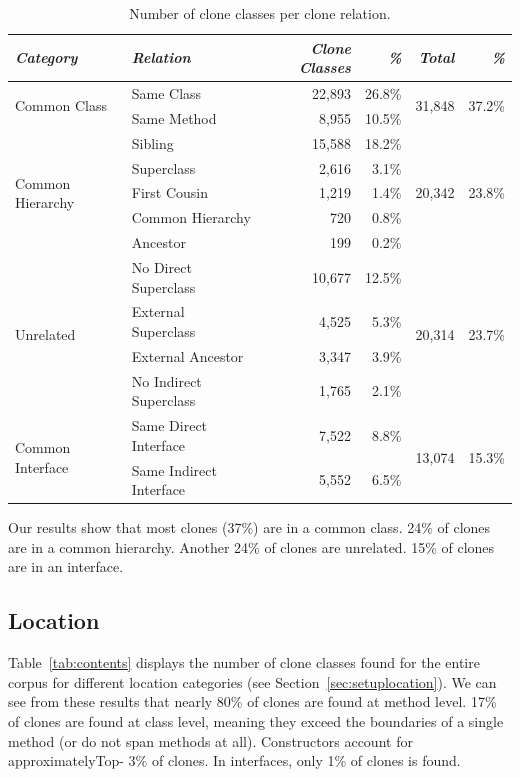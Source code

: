\documentclass[runningheads]{llncs}
\begin{document}
\begin{table}[H]
\centering
\begin{tabular}{@{}llrrrr@{}}
\toprule
\textit{\textbf{Category}} & \textit{\textbf{Relation}} & \textit{\textbf{Clone Classes}} & \textit{\textbf{\%}} & \textit{\textbf{Total}} & \textit{\textbf{\%}} \\ \midrule
\multirow{2}{*}{Common Class} & Same Class & 22,893 & 26.8\% & \multirow{2}{*}{31,848} & \multirow{2}{*}{37.2\%} \\ \cmidrule(lr){2-4}
 & Same Method & 8,955 & 10.5\% & & \\ \midrule
\multirow{5}{*}{Common Hierarchy} & Sibling & 15,588 & 18.2\% & \multirow{5}{*}{20,342}& \multirow{5}{*}{23.8\%} \\ \cmidrule(lr){2-4}
 & Superclass & 2,616 & 3.1\% & & \\ \cmidrule(lr){2-4}
 & First Cousin & 1,219 & 1.4\% & & \\ \cmidrule(lr){2-4}
 & Common Hierarchy & 720 & 0.8\% & & \\ \cmidrule(lr){2-4}
 & Ancestor & 199 & 0.2\% & & \\ \midrule
\multirow{4}{*}{Unrelated} & No Direct Superclass & 10,677 & 12.5\% & \multirow{4}{*}{20,314}& \multirow{4}{*}{23.7\%} \\ \cmidrule(lr){2-4}
 & External Superclass & 4,525 & 5.3\% & & \\ \cmidrule(lr){2-4}
 & External Ancestor & 3,347 & 3.9\% & & \\ \cmidrule(lr){2-4}
 & No Indirect Superclass & 1,765 & 2.1\% & & \\ \midrule
\multirow{2}{*}{Common Interface} & Same Direct Interface & 7,522 & 8.8\% & \multirow{2}{*}{13,074} & \multirow{2}{*}{15.3\%} \\ \cmidrule(lr){2-4}
 & Same Indirect Interface & 5,552 & 6.5\% & & \\ \bottomrule
\end{tabular}
\caption{Number of clone classes per clone relation.}
\label{tab:relation}
\end{table}

Our results show that most clones (37\%) are in a common class. 24\% of clones are in a common hierarchy. Another 24\% of clones are unrelated. 15\% of clones are in an interface.

\subsection{Location}
Table~\ref{tab:contents} displays the number of clone classes found for the entire corpus for different location categories (see Section~\ref{sec:setuplocation}). We can see from these results that nearly 80\% of clones are found at method level. 17\% of clones are found at class level, meaning they exceed the boundaries of a single method (or do not span methods at all). Constructors account for approximatelyTop- 3\% of clones. In interfaces, only 1\% of clones is found.
\end{document}
